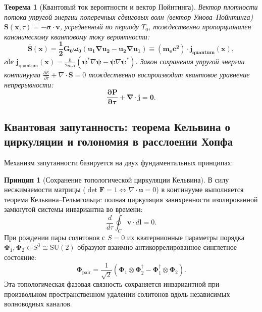 \documentclass[11pt,a4paper,oneside]{article}
\theoremstyle{plain}
\newtheorem{theorem}{Теорема}[section]
\theoremstyle{definition}
\newtheorem{principle}{Принцип}
\theoremstyle{remark}
\numberwithin{equation}{section}
\begin{document}
\begin{theorem}[Квантовый ток вероятности и вектор Пойнтинга]
Вектор плотности потока упругой энергии поперечных сдвиговых волн (вектор Умова--Пойнтинга) $\mathbf{S}(\mathbf{x}, \tau) = - \boldsymbol{\sigma} \cdot \mathbf{v}$, усредненный по периоду $T_0$, тождественно пропорционален каноническому квантовому току вероятности:
\begin{equation}
	\mathbf{\overline{\mathbf{S}}(\mathbf{x}) = \frac{1}{2} G_0 \omega_0 \left( \mathbf{u}_1 \nabla \mathbf{u}_2 - \mathbf{u}_2 \nabla \mathbf{u}_1 \right) \equiv (m_e c^2) \cdot \mathbf{j}_{\text{quantum}}(\mathbf{x})},
\end{equation}
где $\mathbf{j}_{\text{quantum}}(\mathbf{x}) = \frac{\hbar}{2 m_e i} \left( \boldsymbol{\psi}^* \nabla \boldsymbol{\psi} - \boldsymbol{\psi} \nabla \boldsymbol{\psi}^* \right)$.
Закон сохранения упругой энергии континуума $\frac{\partial \overline{\mathcal{E}}}{\partial \tau} + \nabla \cdot \overline{\mathbf{S}} = 0$ тождественно воспроизводит квантовое уравнение непрерывности:
\begin{equation}
	\mathbf{\frac{\partial P}{\partial \tau} + \nabla \cdot \mathbf{j} = 0}.
\end{equation}
\end{theorem}

\subsection{Квантовая запутанность: теорема Кельвина о циркуляции и голономия в расслоении Хопфа}

Механизм запутанности базируется на двух фундаментальных принципах:

\begin{principle}[Сохранение топологической циркуляции Кельвина]
	В силу несжимаемости матрицы ($\det\mathbf{F}=1 \iff \nabla \cdot \mathbf{u} = 0$) в континууме выполняется теорема Кельвина--Гельмгольца: полная циркуляция завихренности изолированной замкнутой системы инвариантна во времени:
	\begin{equation}
		\frac{d}{d\tau} \oint_{C} \mathbf{v} \cdot d\mathbf{l} = 0.
	\end{equation}
	При рождении пары солитонов с $S=0$ их кватернионные параметры порядка $\boldsymbol{\Phi}_1, \boldsymbol{\Phi}_2 \in S^3 \cong \mathrm{SU}(2)$ образуют взаимно антикоррелированное синглетное состояние:
	\begin{equation}
		\boldsymbol{\Phi}_{\text{pair}} = \frac{1}{\sqrt{2}} \left( \boldsymbol{\Phi}_1 \otimes \boldsymbol{\Phi}_2^\dagger - \boldsymbol{\Phi}_1^\dagger \otimes \boldsymbol{\Phi}_2 \right).
	\end{equation}
	Эта топологическая фазовая связность сохраняется инвариантной при произвольном пространственном удалении солитонов вдоль независимых волноводных каналов.
\end{principle}
\end{document}

